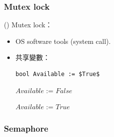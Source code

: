 \subsubsection{Mutex lock}

\begin{theorem}{()} Mutex lock：\begin{itemize}
        \item OS software tools (system call).
        \item 共享變數：\begin{lstlisting}[caption={Shared variables of Mutex lock.}, captionpos=b, mathescape=true]
            bool Available := $True$
        \end{lstlisting}
        \begin{algorithm}[H]
            \caption{$acquire()$.}
            \begin{algorithmic}[1]
                    \EndWhile
                    \State $Available$ := $False$
                \EndFunction
            \end{algorithmic}
        \end{algorithm}
        \begin{algorithm}[H]
            \caption{$release()$.}
            \begin{algorithmic}[1]
                    \State $Available$ := $True$
                \EndFunction
            \end{algorithmic}
        \end{algorithm}
    \end{itemize}
\end{theorem}

\subsubsection{Semaphore}

